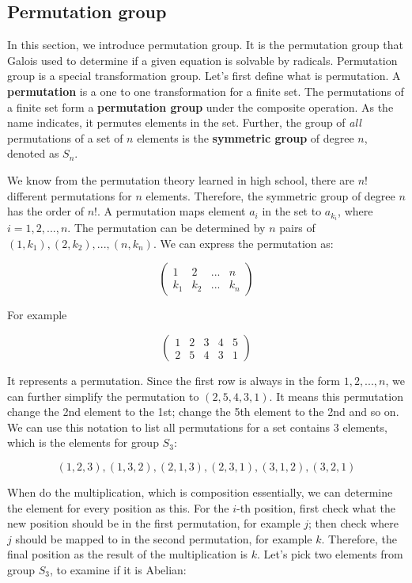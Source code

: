 \documentclass{article}
\begin{document}
\subsection{Permutation group}
\label{permutation group}
\label{symmetric group}

In this section, we introduce permutation group. It is the permutation group that Galois used to determine if a given equation is solvable by radicals. Permutation group is a special transformation group. Let's first define what is permutation. A \textbf{permutation} is a one to one transformation for a finite set. The permutations of a finite set form a \textbf{permutation group} under the composite operation. As the name indicates, it permutes elements in the set. Further, the group of {\em all} permutations of a set of $n$ elements is the \textbf{symmetric group} of degree $n$, denoted as $S_n$.

We know from the permutation theory learned in high school, there are $n!$ different permutations for $n$ elements. Therefore, the symmetric group of degree $n$ has the order of $n!$. A permutation maps element $a_i$ in the set to $a_{k_i}$, where $i = 1, 2, ..., n$. The permutation can be determined by $n$ pairs of $(1, k_1), (2, k_2), ..., (n, k_n)$. We can express the permutation as:

\[
\begin{pmatrix}
1 & 2 & ... & n \\
k_1 & k_2 & ... & k_n
\end{pmatrix}
\]

For example

\[
\begin{pmatrix}
1 & 2 & 3 & 4 & 5 \\
2 & 5 & 4 & 3 & 1
\end{pmatrix}
\]

It represents a permutation. Since the first row is always in the form $1, 2, ..., n$, we can further simplify the permutation to $(2, 5, 4, 3, 1)$. It means this permutation change the 2nd element to the 1st; change the 5th element to the 2nd and so on. We can use this notation to list all permutations for a set contains 3 elements, which is the elements for group $S_3$:

\[
(1, 2, 3), (1, 3, 2), (2, 1, 3), (2, 3, 1), (3, 1, 2), (3, 2, 1)
\]

When do the multiplication, which is composition essentially, we can determine the element for every position as this. For the $i$-th position, first check what the new position should be in the first permutation, for example $j$; then check where $j$ should be mapped to in the second permutation, for example $k$. Therefore, the final position as the result of the multiplication is $k$. Let's pick two elements from group $S_3$, to examine if it is Abelian:
\end{document}
